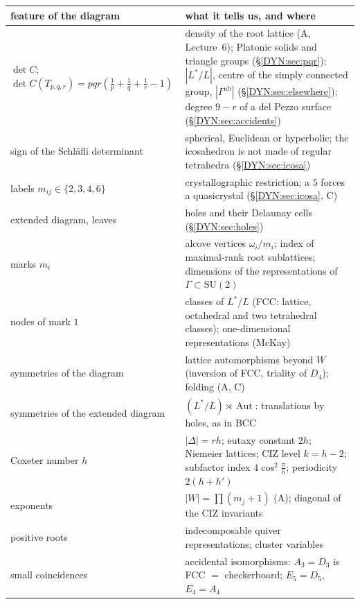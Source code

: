 \documentclass[11pt,openany]{book}
\theoremstyle{plain}
\theoremstyle{definition}
\theoremstyle{remark}
\newcommand{\abs}[1]{\left\lvert #1 \right\rvert}
\begin{document}
\begin{center}
\renewcommand{\arraystretch}{1.25}
\small
\begin{tabular}{p{}p{}}
\toprule
feature of the diagram & what it tells us, and where\\
\midrule
$\det C$; $\det C(T_{p,q,r})=pqr(\frac1p+\frac1q+\frac1r-1)$ & density of the root lattice (A, Lecture~6); Platonic solids and triangle groups (\S\ref{DYN:sec:pqr}); $\abs{L^*/L}$, centre of the simply connected group, $\abs{\Gamma^{\mathrm{ab}}}$ (\S\ref{DYN:sec:elsewhere}); degree $9-r$ of a del Pezzo surface (\S\ref{DYN:sec:accidents})\\
sign of the Schl\"afli determinant & spherical, Euclidean or hyperbolic; the icosahedron is not made of regular tetrahedra (\S\ref{DYN:sec:icosa})\\
labels $m_{ij}\in\{2,3,4,6\}$ & crystallographic restriction; a $5$ forces a quasicrystal (\S\ref{DYN:sec:icosa}, C)\\
extended diagram, leaves & holes and their Delaunay cells (\S\ref{DYN:sec:holes})\\
marks $m_i$ & alcove vertices $\omega_i/m_i$; index of maximal-rank root sublattices; dimensions of the representations of $\Gamma\subset\mathrm{SU}(2)$\\
nodes of mark $1$ & classes of $L^*/L$ (FCC: lattice, octahedral and two tetrahedral classes); one-dimensional representations (McKay)\\
symmetries of the diagram & lattice automorphisms beyond $W$ (inversion of FCC, triality of $D_4$); folding (A, C)\\
symmetries of the extended diagram & $(L^*/L)\rtimes\operatorname{Aut}$: translations by holes, as in BCC\\
Coxeter number $h$ & $\abs\Delta=rh$; eutaxy constant $2h$; Niemeier lattices; CIZ level $k=h-2$; subfactor index $4\cos^2\frac\pi h$; periodicity $2(h+h')$\\
exponents & $\abs W=\prod(m_j+1)$ (A); diagonal of the CIZ invariants\\
positive roots & indecomposable quiver representations; cluster variables\\
small coincidences & accidental isomorphisms: $A_3=D_3$ is FCC $=$ checkerboard; $E_5=D_5$, $E_4=A_4$\\
\bottomrule
\end{tabular}
\end{center}

\end{document}
